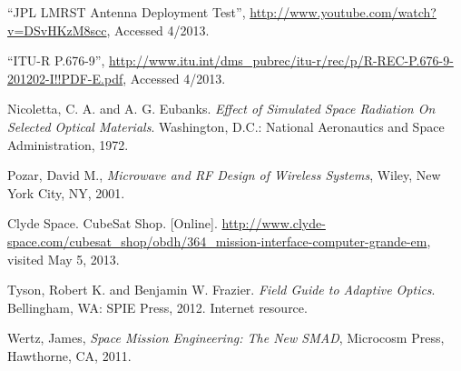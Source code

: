 \documentclass[12pt]{article}
\begin{document}
\begin{thebibliography}{9}
``JPL LMRST Antenna Deployment Test'', \url{http://www.youtube.com/watch?v=DSvHKzM8scc}, Accessed 4/2013.

``ITU-R P.676-9'', \url{http://www.itu.int/dms_pubrec/itu-r/rec/p/R-REC-P.676-9-201202-I!!PDF-E.pdf}, Accessed 4/2013.

   Nicoletta, C. A. and A. G. Eubanks.
   \emph{Effect of Simulated Space Radiation On Selected Optical Materials}. Washington, D.C.: National Aeronautics and Space Administration, 1972.

Pozar, David M., \emph{Microwave and RF Design of Wireless Systems}, Wiley, New York City, NY, 2001.



Clyde Space. CubeSat Shop. [Online]. \url{http://www.clyde-space.com/cubesat_shop/obdh/364_mission-interface-computer-grande-em}, visited May 5, 2013. 






   Tyson, Robert K. and Benjamin W. Frazier. 
   \emph{Field Guide to Adaptive Optics}. Bellingham, WA: SPIE Press, 2012.  Internet resource.

Wertz, James, \emph{Space Mission Engineering: The New SMAD}, Microcosm Press, Hawthorne, CA, 2011.


\end{thebibliography}
\end{document}
